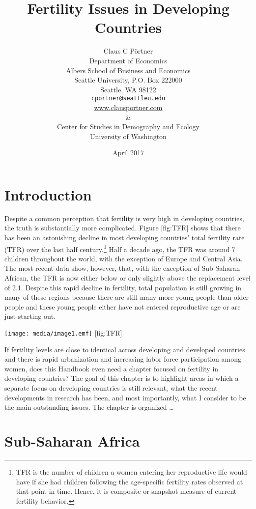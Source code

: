 \documentclass[]{article}
\title{Fertility Issues in Developing Countries}
\author{Claus C Pörtner\\
Department of Economics\\
Albers School of Business and Economics\\
Seattle University, P.O. Box 222000\\
Seattle, WA 98122\\
\href{mailto:cportner@seattleu.edu}{\nolinkurl{cportner@seattleu.edu}}\\
\href{http://www.clausportner.com}{www.clausportner.com}\\
\&\\
Center for Studies in Demography and Ecology\\
University of Washington\\}
\date{April 2017}
\begin{document}
\maketitle

\section{Introduction}\label{introduction}

Despite a common perception that fertility is very high in developing countries, the truth is substantially more complicated. Figure {[}fig:TFR{]} shows that there has been an astonishing decline in most developing countries' total fertility rate (TFR) over the last half century.\footnote{TFR is the number of children a women entering her reproductive life would have if she had children following the age-specific fertility rates observed at that point in time. Hence, it is composite or snapshot measure of current fertility behavior.} Half a decade ago, the TFR was around 7 children throughout the world, with the exception of Europe and Central Asia. The most recent data show, however, that, with the exception of Sub-Saharan African, the TFR is now either below or only slightly above the replacement level of 2.1. Despite this rapid decline in fertility, total population is still growing in many of these regions because there are still many more young people than older people and these young people either have not entered reproductive age or are just starting out.

\texttt{[image: media/image1.emf]} {[}fig:TFR{]}

If fertility levels are close to identical across developing and developed countries and there is rapid urbanization and increasing labor force participation among women, does this Handbook even need a chapter focused on fertility in developing countries? The goal of this chapter is to highlight areas in which a separate focus on developing countries is still relevant, what the recent developments in research has been, and most importantly, what I consider to be the main outstanding issues. The chapter is organized \ldots{}

\section{Sub-Saharan Africa}\label{sub-saharan-africa}
\end{document}

